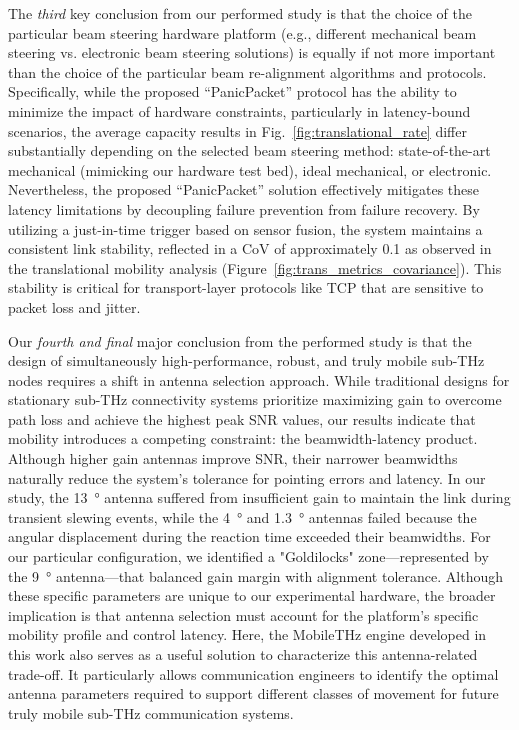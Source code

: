 \documentclass[fleqn,10pt]{wlscirep}
\begin{document}
The \emph{third} key conclusion from our performed study is that the choice of the particular beam steering hardware platform (e.g., different mechanical beam steering vs. electronic beam steering solutions) is equally if not more important than the choice of the particular beam re-alignment algorithms and protocols. Specifically, while the proposed ``PanicPacket'' protocol has the ability to minimize the impact of hardware constraints, particularly in latency-bound scenarios, the average capacity results in Fig.~\ref{fig:translational_rate} differ substantially depending on the selected beam steering method: state-of-the-art mechanical (mimicking our hardware test bed), ideal mechanical, or electronic. Nevertheless, the proposed ``PanicPacket'' solution effectively mitigates these latency limitations by decoupling failure prevention from failure recovery. By utilizing a just-in-time trigger based on sensor fusion, the system maintains a consistent link stability, reflected in a CoV of approximately 0.1 as observed in the translational mobility analysis (Figure~\ref{fig:trans_metrics_covariance}). This stability is critical for transport-layer protocols like TCP that are sensitive to packet loss and jitter\cite{10.1145/52325.52356}. 

Our \emph{fourth and final} major conclusion from the performed study is that the design of simultaneously high-performance, robust, and truly mobile sub-THz nodes requires a shift in antenna selection approach. While traditional designs for stationary sub-THz connectivity systems prioritize maximizing gain to overcome path loss and achieve the highest peak SNR values, our results indicate that mobility introduces a competing constraint: the beamwidth-latency product. Although higher gain antennas improve SNR, their narrower beamwidths naturally reduce the system's tolerance for pointing errors and latency. In our study, the \SI{13}{\degree} antenna suffered from insufficient gain to maintain the link during transient slewing events, while the \SI{4}{\degree} and \SI{1.3}{\degree} antennas failed because the angular displacement during the reaction time exceeded their beamwidths. For our particular configuration, we identified a "Goldilocks" zone—represented by the \SI{9}{\degree} antenna—that balanced gain margin with alignment tolerance. Although these specific parameters are unique to our experimental hardware, the broader implication is that antenna selection must account for the platform's specific mobility profile and control latency. Here, the MobileTHz engine developed in this work also serves as a useful solution to characterize this antenna-related trade-off. It particularly allows communication engineers to identify the optimal antenna parameters required to support different classes of movement for future truly mobile sub-THz communication systems.
\end{document}
